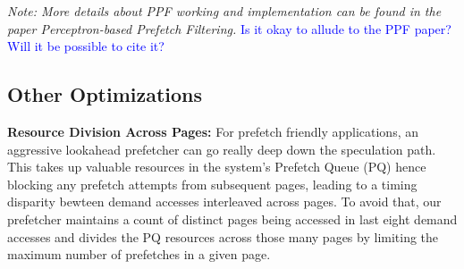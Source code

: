 \textit {Note: More details about PPF working and implementation can be found 
in the paper Perceptron-based Prefetch Filtering.}
\textcolor{blue}{Is it okay to allude to the PPF paper? Will it be possible to cite it?}

\subsection{Other Optimizations}
\label{Enhancements-Misc}

\noindent \textbf{Resource Division Across Pages:}
For prefetch friendly applications, an aggressive lookahead prefetcher can go really
deep down the speculation path. This takes up valuable resources in the system's Prefetch 
Queue (PQ) hence blocking any prefetch attempts from subsequent pages, leading to a timing
disparity bewteen demand accesses interleaved across pages. To avoid that, our prefetcher 
maintains a count of distinct pages being accessed in last eight demand accesses and divides the
PQ resources across those many pages by limiting the maximum number of prefetches in a given 
page.
